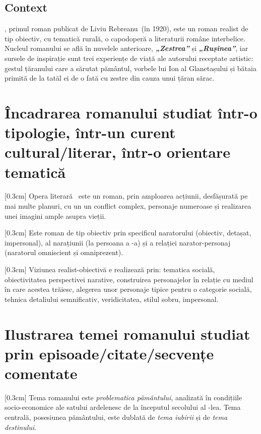 \renewcommand{\operatitle}{\textbfit{„Ion”}} %
\renewcommand{\operaauthor}{Liviu Rebreanu} %


\subsection{Context}

\operatitle, primul roman publicat de \operaauthor\ (în 1920), este un roman realist de tip obiectiv, cu tematică rurală, o capodoperă a literaturii române interbelice. Nucleul romanului se află în nuvelele anterioare, \textbf{\textit{„Zestrea”}} și \textbf{\textit{„Rușinea”}}, iar sursele de inspirație sunt trei experiențe de viață ale autorului receptate artistic: gestul țăranului care a sărutat pământul, vorbele lui Ion al Glanetașului și bătaia primită de la tatăl ei de o fată cu zestre din cauza unui țăran sărac.


\section{Încadrarea romanului studiat într-o tipologie, într-un curent cultural/literar, într-o orientare tematică}

[0.3cm]
Opera literară \operatitle\ este un roman, prin amploarea acțiunii, desfășurată pe mai multe planuri, cu un un conflict complex, personaje numeroase și realizarea unei imagini ample asupra vieții.

[0.3cm]
Este roman de tip obiectiv prin specificul naratorului (obiectiv, detașat, impersonal), al narațiunii (la persoana a -a) și a relației narator-personaj (naratorul omniscient și omniprezent).

[0.3cm]
Viziunea realist-obiectivă e realizează prin: tematica socială, obiectivitatea perspectivei narative, construirea personajelor în relație cu mediul în care acestea trăiesc, alegerea unor personaje tipice pentru o categorie socială, tehnica detaliului semnificativ, veridicitatea, stilul sobru, impersonal.


\section{Ilustrarea temei romanului studiat prin episoade/citate/sec\-ven\-țe comentate}

[0.3cm]
Tema romanului este \textit{problematica pământului}, analizată în condițiile so\-ci\-o-e\-co\-no\-mi\-ce ale satului ardelenesc de la începutul secolului al -lea. Tema centrală, posesiunea pământului, este dublată de \textit{tema iubirii} și de \textit{tema destinului}.

